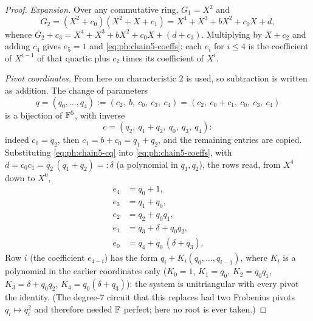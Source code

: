 \begin{proof}
\emph{Expansion.}  Over any commutative ring, $G_1=X^2$ and
\[
  G_2=(X^2+c_0)(X^2+X+c_1)=X^4+X^3+bX^2+c_0X+d ,
\]
whence $G_2+c_3=X^4+X^3+bX^2+c_0X+(d+c_3)$.  Multiplying by $X+c_2$ and
adding $c_4$ gives $e_5=1$ and \eqref{eq:ph:chain5-coeffs}: each $e_i$ for
$i\le4$ is the coefficient of $X^{i-1}$ of that quartic plus $c_2$ times its
coefficient of $X^i$.

\emph{Pivot coordinates.}  From here on characteristic $2$ is used, so subtraction is written as addition.  The change of parameters
\begin{equation}\label{eq:ph:chain5-q}
  q=(q_0,\dots,q_4):=(c_2,\ b,\ c_0,\ c_3,\ c_4)
  =(c_2,\ c_0+c_1,\ c_0,\ c_3,\ c_4)
\end{equation}
is a bijection of $\mathbb{F}^5$, with inverse
\begin{equation}\label{eq:ph:chain5-cq}
  c=(q_2,\ q_1+q_2,\ q_0,\ q_3,\ q_4):
\end{equation}
indeed $c_0=q_2$, then $c_1=b+c_0=q_1+q_2$, and the remaining entries are
copied.  Substituting \eqref{eq:ph:chain5-cq} into
\eqref{eq:ph:chain5-coeffs}, with
$d=c_0c_1=q_2\,(q_1+q_2)=:\delta$ (a polynomial in $q_1,q_2$), the rows
read, from $X^4$ down to $X^0$,
\begin{equation}\label{eq:ph:chain5-rows}
\begin{aligned}
  e_4&=q_0+1,\\
  e_3&=q_1+q_0,\\
  e_2&=q_2+q_0q_1,\\
  e_1&=q_3+\delta+q_0q_2,\\
  e_0&=q_4+q_0\,(\delta+q_3).
\end{aligned}
\end{equation}
Row $i$ (the coefficient $e_{4-i}$) has the form $q_i+K_i(q_0,\dots,q_{i-1})$,
where $K_i$ is a polynomial in the earlier coordinates only
($K_0=1$, $K_1=q_0$, $K_2=q_0q_1$, $K_3=\delta+q_0q_2$,
$K_4=q_0(\delta+q_3)$): the system is unitriangular with every pivot the
identity.  (The degree-$7$ circuit that this replaces had two Frobenius
pivots $q_i\mapsto q_i^2$ and therefore needed $\mathbb{F}$ perfect; here no root is
ever taken.)


\end{proof}
